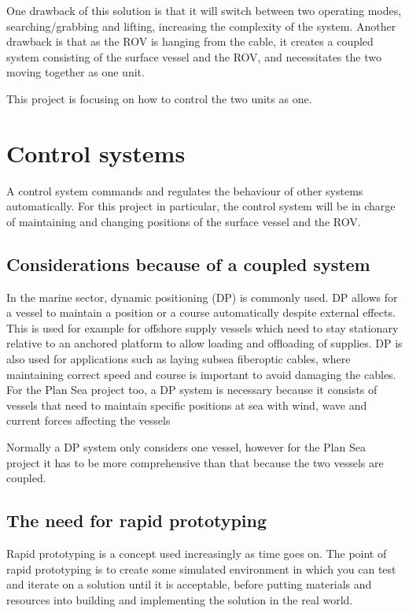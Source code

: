 One drawback of this solution is that it will switch between two operating modes, searching/grabbing and lifting, increasing the complexity of the system. Another drawback is that as the ROV is hanging from the cable, it creates a coupled system consisting of the surface vessel and the ROV, and necessitates the two moving together as one unit. 

This project is focusing on how to control the two units as one. 

\section{Control systems}
A control system commands and regulates the behaviour of other systems automatically. For this project in particular, the control system will be in charge of maintaining and changing positions of the surface vessel and the ROV. 

\subsection{Considerations because of a coupled system}
In the marine sector, dynamic positioning (DP) is commonly used. DP allows for a vessel to maintain a position or a course automatically despite external effects. This is used for example for offshore supply vessels which need to stay stationary relative to an anchored platform to allow loading and offloading of supplies. DP is also used for applications such as laying subsea fiberoptic cables, where maintaining correct speed and course is important to avoid damaging the cables. For the Plan Sea project too, a DP system is necessary because it consists of vessels that need to maintain specific positions at sea with wind, wave and current forces affecting the vessels

Normally a DP system only considers one vessel, however for the Plan Sea project it has to be more comprehensive than that because the two vessels are coupled. 

\subsection{The need for rapid prototyping}
Rapid prototyping is a concept used increasingly as time goes on. The point of rapid prototyping is to create some simulated environment in which you can test and iterate on a solution until it is acceptable, before putting materials and resources into building and implementing the solution in the real world. 

